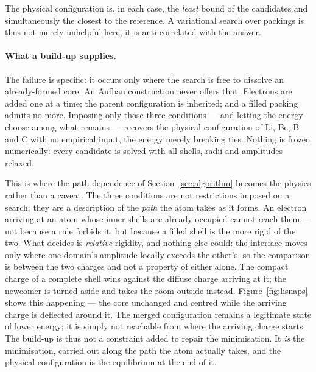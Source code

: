 \documentclass[11pt]{article}
\begin{document}
The physical configuration is, in each case, the \emph{least} bound of the
candidates and simultaneously the closest to the reference. A variational search over
packings is thus not merely unhelpful here; it is anti-correlated with the answer.

\paragraph{What a build-up supplies.} The failure is specific: it occurs only where the
search is free to dissolve an already-formed core. An Aufbau construction never offers
that. Electrons are added one at a time; the parent configuration is inherited; and a
filled packing admits no more. Imposing only those three conditions --- and letting the
energy choose among what remains --- recovers the physical configuration of Li, Be, B and
C with no empirical input, the energy merely breaking ties. Nothing is frozen
numerically: every candidate is solved with all shells, radii and amplitudes relaxed.

This is where the path dependence of Section~\ref{sec:algorithm} becomes the physics rather
than a caveat. The three conditions are not restrictions imposed on a search; they are a
description of the \emph{path} the atom takes as it forms. An electron arriving at an atom
whose inner shells are already occupied cannot reach them --- not because a rule forbids it,
but because a filled shell is the more rigid of the two. What decides is \emph{relative}
rigidity, and nothing else could: the interface moves only where one domain's amplitude locally
exceeds the other's, so the comparison is between the two charges and not a property of either
alone. The compact charge of a complete shell wins against the diffuse charge arriving at it;
the newcomer is turned aside and takes the room outside instead. Figure~\ref{fig:lisnaps}
shows this happening --- the core unchanged and centred while the arriving charge is deflected
around it. The merged configuration remains a legitimate
state of lower energy; it is simply not reachable from where the arriving charge starts. The
build-up is thus not a constraint added to repair the minimisation. It \emph{is} the
minimisation, carried out along the path the atom actually takes, and the physical
configuration is the equilibrium at the end of it.
\end{document}
